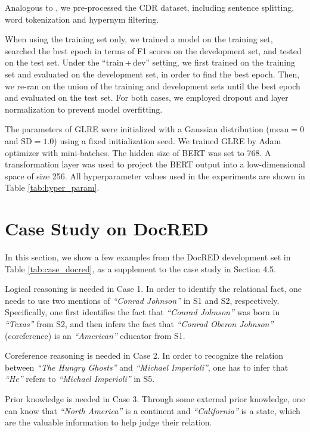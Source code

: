 \documentclass[11pt,a4paper]{article}
\begin{document}
Analogous to \citet{christopoulou2019connecting}, we pre-processed the CDR dataset, including sentence splitting, word tokenization and hypernym filtering. 

When using the training set only, we trained a model on the training set, searched the best epoch in terms of F1 scores on the development set, and tested on the test set. Under the ``train\,+\,dev'' setting, we first trained on the training set and evaluated on the development set, in order to find the best epoch. Then, we re-ran on the union of the training and development sets until the best epoch and evaluated on the test set.
For both cases, we employed dropout and layer normalization \cite{ba2016layer} to prevent model overfitting. 

The parameters of GLRE were initialized with a Gaussian distribution ($\textrm{mean} = 0$ and $\textrm{SD} = 1.0$) using a fixed initialization seed. We trained GLRE by Adam optimizer \citep{kingma2015adam} with mini-batches. The hidden size of BERT was set to 768. A transformation layer was used to project the BERT output into a low-dimensional space of size 256. All hyperparameter values used in the experiments are shown in Table \ref{tab:hyper_param}.


\section{Case Study on DocRED}

In this section, we show a few examples from the DocRED development set in Table \ref{tab:case_docred}, as a supplement to the case study in Section 4.5.
\begin{compactenum}[(1)]
\item Logical reasoning is needed in Case 1. In order to identify the relational fact, one needs to use two mentions of \textit{``Conrad Johnson''} in S1 and S2, respectively. Specifically, one first identifies the fact that \textit{``Conrad Johnson''} was born in \textit{``Texas''} from S2, and then infers the fact that \textit{``Conrad Oberon Johnson''} (coreference) is an \textit{``American''} educator from S1. 

\item Coreference reasoning is needed in Case 2. In order to recognize the relation between \textit{``The Hungry Ghosts''} and \textit{``Michael Imperioli''}, one has to infer that \textit{``He''} refers to \textit{``Michael Imperioli''} in S5.

\item Prior knowledge is needed in Case 3. Through some external prior knowledge, one can know that \textit{``North America''} is a continent and \textit{``California''} is a state, which are the valuable information to help judge their relation. 
\end{compactenum}
\end{document}
